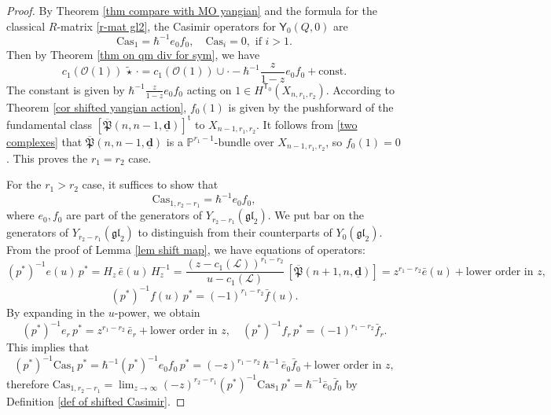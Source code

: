 \documentclass[10pt]{amsart}
\theoremstyle{definition}
\numberwithin{equation}{section}
\newcommand{\bP}{\mathbb{P}}
\newcommand{\bd}{\mathbf{d}}
\newcommand{\sT}{\mathsf{T}}
\begin{document}
\begin{proof}
By Theorem \ref{thm compare with MO yangian} and the formula for the classical $R$-matrix \eqref{r-mat gl2}, the Casimir operators for $\mathsf Y_0(Q,0)$ are $$\mathrm{Cas}_{1}=\hbar^{-1}e_0f_0, \quad \mathrm{Cas}_{i}=0, \,\, \mathrm{if}\, \, i>1.$$ 
Then by Theorem \ref{thm on qm div for sym}, we have 
$$c_1(\mathcal O(1))\,\widetilde{\star}\,\cdot=c_1(\mathcal O(1))\cup \cdot - \hbar^{-1}\frac{z}{1-z}e_0f_0+\mathrm{const}. $$ 
The constant is given by $\hbar^{-1}\frac{z}{1-z}e_0f_0$ acting on $1\in H^{\sT_0}(X_{n,r_1,r_2})$. According to Theorem \ref{cor shifted yangian action}, $f_0(1)$ is given by the pushforward of the fundamental class $[\overline{\mathfrak{P}}(n,n-1,\underline{\bd})]^{\mathrm{t}}$ to $X_{n-1,r_1,r_2}$. It follows from \eqref{two complexes} that $\overline{\mathfrak{P}}(n,n-1,\underline{\bd})$ is a $\bP^{r_1-1}$-bundle over $X_{n-1,r_1,r_2}$, so $f_0(1)=0$. This proves the $r_1=r_2$ case.

For the $r_1>r_2$ case, it suffices to show that 
$$\mathrm{Cas}_{1,r_2-r_1}= \hbar^{-1}e_0f_0, $$ 
where $e_0,f_0$ are part of the generators of $Y_{r_2-r_1}(\mathfrak{gl}_2)$. We put bar on the generators of $Y_{r_2-r_1}(\mathfrak{gl}_2)$ to distinguish from their counterparts of $Y_{0}(\mathfrak{gl}_2)$. From the proof of Lemma \ref{lem shift map}, we have equations of operators: 
$$(p^{*})^{-1}e(u)\,p^{*}=H_{z}\,\bar e(u)\,H_{z}^{-1}=\frac{(z-c_1(\mathcal L))^{r_1-r_2}}{u-c_1(\mathcal L)}\,[\overline{\mathfrak{P}}(n+1,n,\underline{\bd})]
=z^{r_1-r_2}\bar e(u)+\text{lower order in $z$}, $$
$$(p^{*})^{-1}f(u)\,p^{*}=(-1)^{r_1-r_2}\bar f(u).$$
By expanding in the $u$-power, we obtain 
$$(p^{*})^{-1}e_r\,p^{*}=z^{r_1-r_2}\, \bar e_r+\text{lower order in $z$}, \quad (p^{*})^{-1}f_r\,p^{*}=(-1)^{r_1-r_2}\bar f_r. $$ 
This implies that 
\begin{equation*}
(p^{*})^{-1}\mathrm{Cas}_1\,p^{*}=\hbar^{-1}(p^{*})^{-1}e_0f_0\,p^{*}=(-z)^{r_1-r_2}\,\hbar^{-1}\, \bar e_0\bar f_0+\text{lower order in $z$},
\end{equation*}
therefore $\mathrm{Cas}_{1,r_2-r_1}=\lim_{z\to \infty}(-z)^{r_2-r_1}(p^{*})^{-1}\mathrm{Cas}_1\,p^{*}=\hbar^{-1}\bar e_0\bar f_0$ by Definition \ref{def of shifted Casimir}.
\end{proof}
\end{document}
